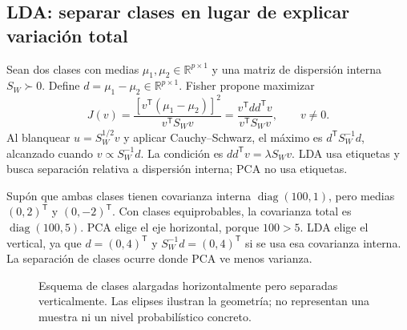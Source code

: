 \documentclass[11pt,a4paper]{article}
\newcommand{\R}{\mathbb R}
\newcommand{\T}{^{\mathsf T}}
\DeclareMathOperator{\diag}{diag}
\theoremstyle{definition}
\begin{document}
\subsection{LDA: separar clases en lugar de explicar variación total}
Sean dos clases con medias $\mu_1,\mu_2\in\R^{p\times1}$ y una matriz de dispersión interna $S_W\succ0$. Define $d=\mu_1-\mu_2\in\R^{p\times1}$. Fisher propone maximizar
\[
J(v)=\frac{[v\T(\mu_1-\mu_2)]^2}{v\T S_Wv}
=\frac{v\T dd\T v}{v\T S_Wv},\qquad v\ne0.
\]
Al blanquear $u=S_W^{1/2}v$ y aplicar Cauchy--Schwarz, el máximo es $d\T S_W^{-1}d$, alcanzado cuando $v\propto S_W^{-1}d$. La condición es $dd\T v=\lambda S_Wv$. LDA usa etiquetas y busca separación relativa a dispersión interna; PCA no usa etiquetas.
\begin{ejemplo}
Supón que ambas clases tienen covarianza interna $\diag(100,1)$, pero medias $(0,2)\T$ y $(0,-2)\T$. Con clases equiprobables, la covarianza total es $\diag(100,5)$. PCA elige el eje horizontal, porque $100>5$. LDA elige el vertical, ya que $d=(0,4)\T$ y $S_W^{-1}d=(0,4)\T$ si se usa esa covarianza interna. La separación de clases ocurre donde PCA ve menos varianza.
\end{ejemplo}
\begin{figure}[H]\centering
{}
\caption{Esquema de clases alargadas horizontalmente pero separadas verticalmente. Las elipses ilustran la geometría; no representan una muestra ni un nivel probabilístico concreto.}
\end{figure}
\end{document}
